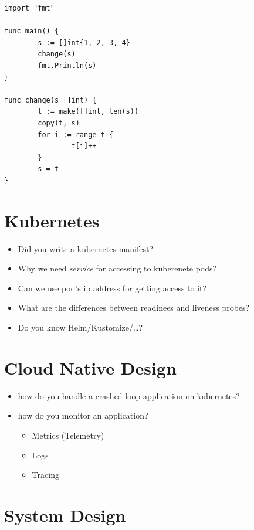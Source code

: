 \documentclass[]{article}
\begin{document}
\begin{multicols}{2}
\begin{itemize}
\begin{verbatim}
import "fmt"

func main() {
        s := []int{1, 2, 3, 4}
        change(s)
        fmt.Println(s)
}

func change(s []int) {
        t := make([]int, len(s))
        copy(t, s)
        for i := range t {
                t[i]++
        }
        s = t
}
      \end{verbatim}

  \end{itemize}

  \section{Kubernetes}

  \begin{itemize}
    \item Did you write a kubernetes manifest?
    \item Why we need \textit{service} for accessing to kuberenete pods?
    \item Can we use pod's ip address for getting access to it?
    \item What are the differences between readinees and liveness probes?
    \item Do you know Helm/Kustomize/\ldots?
  \end{itemize}

  \section{Cloud Native Design}

  \begin{itemize}
    \item how do you handle a crashed loop application on kubernetes?
    \item how do you monitor an application?
      \begin{itemize}
        \item Metrics (Telemetry)
        \item Logs
        \item Tracing
      \end{itemize}
  \end{itemize}

  \section{System Design}


\end{multicols}
\end{document}
